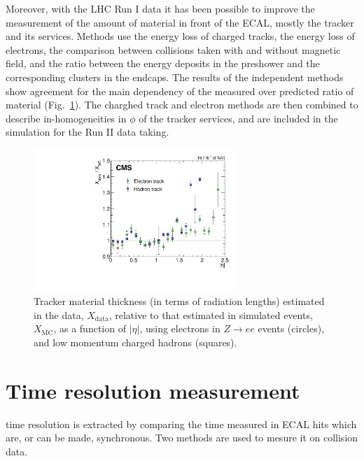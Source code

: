 \documentclass[journal]{IEEEtran}
\begin{document}
Moreover, with the LHC Run I data it has been possible to improve the measurement of the amount of material in front of the ECAL, mostly the tracker and its services. Methods use the energy loss of charged tracks, the energy loss of electrons, the comparison between collisions taken with and without magnetic field, and the ratio between the energy deposits in the preshower and the corresponding clusters in the endcaps. The results of the independent methods show agreement for the main dependency of the measured over predicted ratio of material (Fig.~\ref{fig:material}). The charghed track and electron methods are then combined to describe in-homogeneities in $\phi$ of the tracker services, and are included in the simulation for the Run II data taking.
%
\begin{figure}[!t]
  \begin{center}
    \includegraphics[width=3.0in]{material}
    \caption{Tracker material thickness (in terms of radiation lengths) estimated in the data, $X_\mathrm{data}$, relative to that estimated in simulated events, $X_\mathrm{MC}$, as a function of $\vert\eta\vert$, using electrons in $Z\to ee$ events (circles), and low momentum charged hadrons (squares). \label{fig:material}}
  \end{center}
\end{figure}
%



\section{Time resolution measurement}
 time resolution is extracted by comparing the time measured in ECAL hits which are, or can be made, synchronous. Two methods are used to mesure it on collision data.
\end{document}

